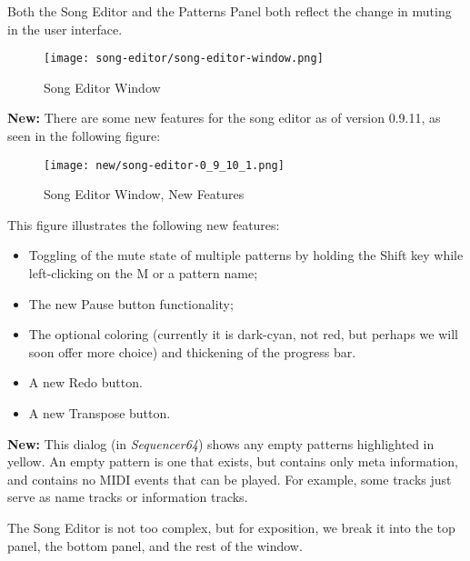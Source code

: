    Both the Song Editor and the Patterns Panel both reflect the change in
   muting in the user interface.

\begin{figure}[H]
   \centering 
   \texttt{[image: song-editor/song-editor-window.png]}
   \caption{Song Editor Window}
   \label{fig:song_editor_window}
\end{figure}

   \textbf{New:}
   There are some new features for the song editor as of version 0.9.11, as
   seen in the following figure:

\begin{figure}[H]
   \centering 
   \texttt{[image: new/song-editor-0\_9\_10\_1.png]}
   \caption{Song Editor Window, New Features}
   \label{fig:song_editor_window_new_features}
\end{figure}

   This figure illustrates the following new features:

   \begin{itemize}
      \item Toggling of the mute state of multiple patterns by holding the
         Shift key while left-clicking on the M or a pattern name;
      \item The new Pause button functionality;
      \item The optional coloring (currently it is dark-cyan, not red, but
      perhaps we will soon offer more choice) and thickening of the progress
      bar.
      \item A new Redo button.
      \item A new Transpose button.
   \end{itemize}

   \textbf{New:} 
   This dialog (in \textsl{Sequencer64}) shows any empty patterns
   highlighted in yellow.  An empty pattern is one that exists, but
   contains only meta information, and contains no MIDI events that
   can be played.  For example, some tracks just serve as name tracks or
   information tracks.
   
   The Song Editor is not too complex, but for exposition, we break it into
   the top panel, the bottom panel, and the rest of the window.

